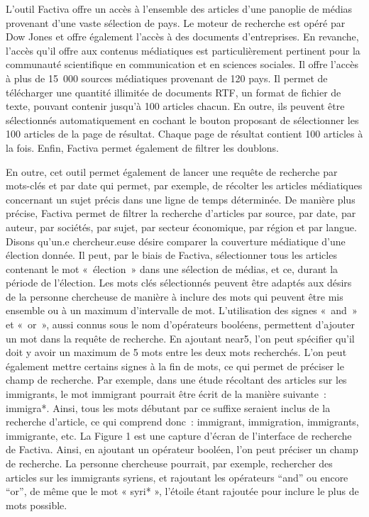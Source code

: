 \documentclass[
  letterpaper,
]{scrbook}
\begin{document}
L'outil Factiva offre un accès à l'ensemble des articles d'une panoplie
de médias provenant d'une vaste sélection de pays. Le moteur de
recherche est opéré par Dow Jones et offre également l'accès à des
documents d'entreprises. En revanche, l'accès qu'il offre aux contenus
médiatiques est particulièrement pertinent pour la communauté
scientifique en communication et en sciences sociales. Il offre l'accès
à plus de 15~000 sources médiatiques provenant de 120 pays. Il permet de
télécharger une quantité illimitée de documents RTF, un format de
fichier de texte, pouvant contenir jusqu'à 100 articles chacun. En
outre, ils peuvent être sélectionnés automatiquement en cochant le
bouton proposant de sélectionner les 100 articles de la page de
résultat. Chaque page de résultat contient 100 articles à la fois.
Enfin, Factiva permet également de filtrer les doublons.

En outre, cet outil permet également de lancer une requête de recherche
par mots-clés et par date qui permet, par exemple, de récolter les
articles médiatiques concernant un sujet précis dans une ligne de temps
déterminée. De manière plus précise, Factiva permet de filtrer la
recherche d'articles par source, par date, par auteur, par sociétés, par
sujet, par secteur économique, par région et par langue. Disons qu'un.e
chercheur.euse désire comparer la couverture médiatique d'une élection
donnée. Il peut, par le biais de Factiva, sélectionner tous les articles
contenant le mot «~élection~» dans une sélection de médias, et ce,
durant la période de l'élection. Les mots clés sélectionnés peuvent être
adaptés aux désirs de la personne chercheuse de manière à inclure des
mots qui peuvent être mis ensemble ou à un maximum d'intervalle de mot.
L'utilisation des signes «~and~» et «~or~», aussi connus sous le nom
d'opérateurs booléens, permettent d'ajouter un mot dans la requête de
recherche. En ajoutant near5, l'on peut spécifier qu'il doit y avoir un
maximum de 5 mots entre les deux mots recherchés. L'on peut également
mettre certains signes à la fin de mots, ce qui permet de préciser le
champ de recherche. Par exemple, dans une étude récoltant des articles
sur les immigrants, le mot immigrant pourrait être écrit de la manière
suivante~: immigra*. Ainsi, tous les mots débutant par ce suffixe
seraient inclus de la recherche d'article, ce qui comprend donc~:
immigrant, immigration, immigrants, immigrante, etc. La Figure 1 est une
capture d'écran de l'interface de recherche de Factiva. Ainsi, en
ajoutant un opérateur booléen, l'on peut préciser un champ de recherche.
La personne chercheuse pourrait, par exemple, rechercher des articles
sur les immigrants syriens, et rajoutant les opérateurs ``and'' ou
encore ``or'', de même que le mot « syri* », l'étoile étant rajoutée
pour inclure le plus de mots possible.
\end{document}
